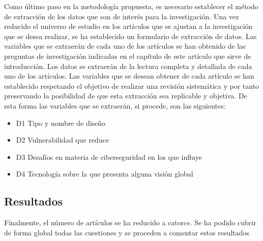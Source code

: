\documentclass[12pt,a4paper,onecolumn,oneside]{report}
\begin{document}
Como último paso en la metodología propuesta, es necesario establecer el método de extracción de los datos que son de interés para la investigación. Una vez reducido el universo de estudio en los artículos que se ajustan a la investigación que se desea realizar, se ha establecido un formulario de extracción de datos. Las variables que se extraerán de cada uno de los artículos se han obtenido de las preguntas de investigación indicadas en el capítulo de este artículo que sirve de introducción. Los datos se extraerán de la lectura completa y detallada de cada uno de los artículos. Las variables que se desean obtener de cada artículo se han establecido respetando el objetivo de realizar una revisión sistemática y por tanto preservando la posibilidad de que esta extracción sea replicable y objetiva. De esta forma las variables que se extraerán, si procede, son las siguientes:

\begin{itemize}
\item D1 Tipo y nombre de diseño
\item D2 Vulnerabilidad que reduce
\item D3 Desafíos en materia de ciberseguridad en los que influye
\item D4 Tecnología sobre la que presenta alguna visión global
\end{itemize}


\subsection{Resultados}

Finalmente, el número de artículos se ha reducido a catorce. Se ha podido cubrir de forma global todas las cuestiones y se proceden a comentar estos resultados
\end{document}
